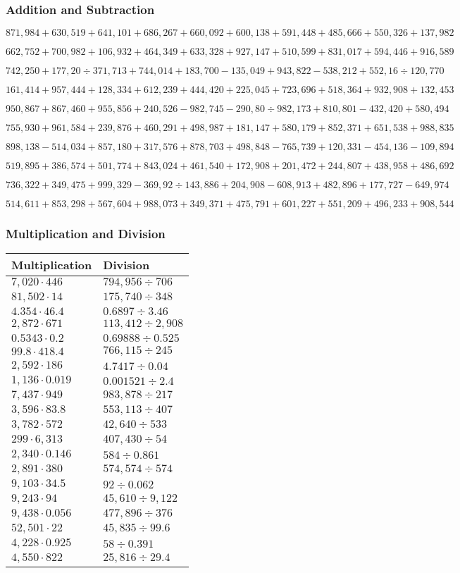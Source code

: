 \hypertarget{addition-and-subtraction-307}{%
\subsubsection{Addition and
Subtraction}\label{addition-and-subtraction-307}}

\(871,984+630,519+641,101+686,267+660,092+600,138+591,448+485,666+550,326+ 137,982\)

\(662,752+700,982+106,932+464,349+633,328+927,147+510,599+831,017+594,446+916,589\)

\(742,250+177,20÷371,713+744,014+183,700-135,049+943,822-538,212+552,16÷120,770\)

\(161,414+957,444+128,334+612,239+444,420+225,045+723,696+518,364+932,908+132,453\)

\(950,867+867,460+955,856+240,526-982,745-290,80÷982,173+810,801-432,420+580,494\)

\(755,930+961,584+239,876+460,291+498,987+181,147+580,179+852,371+651,538+988,835\)

\(898,138-514,034+857,180+317,576+878,703+498,848-765,739+120,331-454,136-109,894\)

\(519,895+386,574+501,774+843,024+461,540+172,908+201,472+244,807+438,958+486,692\)

\(736,322+349,475+999,329-369,92÷143,886+204,908-608,913+482,896+177,727-649,974\)

\(514,611+853,298+567,604+988,073+349,371+475,791+601,227+551,209+496,233+908,544\)

\hypertarget{multiplication-and-division-306}{%
\subsubsection{Multiplication and
Division}\label{multiplication-and-division-306}}

\begin{longtable}[]{@{}ll@{}}
\toprule
Multiplication & Division\tabularnewline
\midrule
\endhead
\(7,020\cdot446\) & \(794,956÷706\)\tabularnewline
\(81,502\cdot14\) & \(175,740 ÷348\)\tabularnewline
\(4.354\cdot46.4\) & \(0.6897÷3.46\)\tabularnewline
\(2,872\cdot671\) & \(113,412÷2,908\)\tabularnewline
\(0.5343\cdot0.2\) & \(0.69888÷0.525\)\tabularnewline
\(99.8\cdot418.4\) & \(766,115÷245\)\tabularnewline
\(2,592\cdot186\) & \(4.7417÷0.04\)\tabularnewline
\(1,136\cdot0.019\) & \(0.001521÷2.4\)\tabularnewline
\(7,437\cdot949\) & \(983,878÷217\)\tabularnewline
\(3,596\cdot83.8\) & \(553,113÷407\)\tabularnewline
\(3,782\cdot572\) & \(42,640÷533\)\tabularnewline
\(299\cdot6,313\) & \(407,430÷54\)\tabularnewline
\(2,340\cdot0.146\) & \(584÷0.861\)\tabularnewline
\(2,891\cdot380\) & \(574,574÷574\)\tabularnewline
\(9,103\cdot34.5\) & \(92÷0.062\)\tabularnewline
\(9,243\cdot94\) & \(45,610÷9,122\)\tabularnewline
\(9,438\cdot0.056\) & \(477,896÷376\)\tabularnewline
\(52,501\cdot22\) & \(45,835÷99.6\)\tabularnewline
\(4,228\cdot0.925\) & \(58÷0.391\)\tabularnewline
\(4,550\cdot822\) & \(25,816÷29.4\)\tabularnewline
\bottomrule
\end{longtable}

